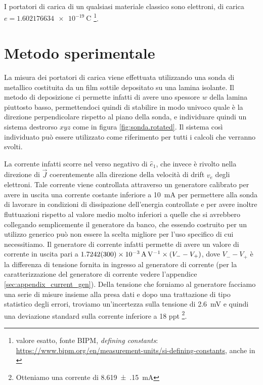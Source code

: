 \documentclass[
    prl,
    reprint, 
    superscriptaddress, 
    altaffilletter, 
    amsmath, 
    amssymb, 
    a4paper,
    varvw]{revtex4-2}
\begin{document}
I portatori di carica di un qualsiasi materiale classico sono elettroni, di carica $e=\SI{1.602176634e-19}{\coulomb}$ \footnote{valore esatto, fonte BIPM, \emph{defining constants}: \url{https://www.bipm.org/en/measurement-units/si-defining-constants}, anche in \cite{Newell_2018}}. 

\section{Metodo sperimentale}
La misura dei portatori di carica viene effettuata utilizzando una sonda di  metallico costituita da un film sottile depositato su una lamina isolante. Il metodo di deposizione ci permette infatti di avere uno spessore $w$ della lamina piuttosto basso, permettendoci quindi di stabilire in modo univoco quale è la direzione perpendicolare rispetto al piano della sonda, e individuare quindi un sistema destrorso $xyz$ come in figura \ref{fig:sonda.rotated}. Il sistema così individuato può essere utilizzato come riferimento per tutti i calcoli che verranno svolti.

La corrente infatti scorre nel verso negativo di $\hat{e}_1$, che invece è rivolto nella direzione di $\vec{J}$ coerentemente alla direzione della velocità di drift $v_e$ degli elettroni. Tale corrente viene controllata attraverso un generatore calibrato per avere in uscita una corrente costante inferiore a \SI{10}{\milli\ampere} per permettere alla sonda di lavorare in condizioni di dissipazione dell'energia controllate e per avere inoltre fluttuazioni rispetto al valore medio molto inferiori a quelle che si avrebbero collegando semplicemente il generatore da banco, che essendo costruito per un utilizzo generico può non essere la scelta migliore per l'uso specifico di cui necessitiamo. Il generatore di corrente infatti permette di avere un valore di corrente in uscita pari a $\SI{1.7242(300)e-3}{\ampere\per\volt}\times\qty(V_--V_+)$, dove $V_--V_+$ è la differenza di tensione fornita in ingresso al generatore di corrente (per la caratterizzazione del generatore di corrente vedere l'appendice \ref{sec:appendix_current_gen}). Della tensione che forniamo al generatore facciamo una serie di misure insieme alla presa dati e dopo una trattazione di tipo statistico degli errori, troviamo un'incertezza sulla tensione di \SI{2.6}{\milli\volt} e quindi una deviazione standard sulla corrente inferiore a 18 ppt \footnote{Otteniamo una corrente di \SI[separate-uncertainty=true]{8.619(150)}{\milli\ampere}}. 
\end{document}
